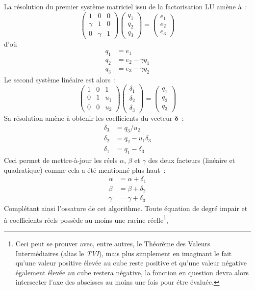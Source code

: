 \documentclass[11pt]{amsart}
\newcommand{\vb}[1]{\mathbf{#1}}
\begin{document}
La r\'esolution du premier syst\`eme matriciel issu de la factorisation LU am\`ene \`a~:
$$\begin{pmatrix} 1 & 0 & 0 \\ \gamma & 1 & 0  \\ 0 & \gamma & 1 \end{pmatrix}\begin{pmatrix} q_1 \\ q_2 \\ q_3 \end{pmatrix}=\begin{pmatrix} e_1 \\ e_2 \\ e_3 \end{pmatrix}$$
d'o\`u
\[
\begin{split}
	q_1 &= e_1 \\
	q_2 &= e_2 - \gamma{}q_1 \\
	q_3 &= e_3 - \gamma{}q_2
\end{split}
\]
Le second syst\`eme lin\'eaire est alors~:
$$\begin{pmatrix} 1 & 0 & 1 \\ 0 & 1 & u_1 \\ 0 & 0 & u_2 \end{pmatrix}\begin{pmatrix} \delta_1 \\ \delta_2 \\ \delta_3 \end{pmatrix}=\begin{pmatrix} q_1 \\ q_2 \\ q_3 \end{pmatrix}$$
Sa r\'esolution am\`ene \`a obtenir les coefficients du vecteur $\vb{\delta}$~:
\[
\begin{split}
\delta_3 &= q_3 / u_2 \\
\delta_2 &= q_2 - u_1\delta_3 \\
\delta_1 &= q_1 - \delta_3
\end{split}
\]
Ceci permet de mettre-\`a-jour les r\'eels $\alpha$, $\beta$ et $\gamma$ des deux facteurs (lin\'eaire et quadratique) comme cela a \'et\'e mentionn\'e plus haut~:
\[
\begin{split}
\alpha &= \alpha + \delta_1 \\
\beta &= \beta + \delta_2 \\
\gamma &= \gamma + \delta_3
\end{split}
\]
Compl\'etant ainsi l'ossature de cet algorithme. Toute \'equation de degr\'e impair et \`a coefficients r\'eels poss\`ede au moins une racine r\'eelle\footnote{Ceci peut se prouver avec, entre autres, le Th\'eor\`eme des Valeurs Interm\'ediaires (alias le \textit{TVI}),
mais plus simplement en imaginant le fait qu'une valeur positive \'elev\'ee au cube reste positive et qu'une valeur n\'egative \'egalement \'elev\'ee au cube restera n\'egative, la fonction en question devra alors intersecter l'axe des abscisses au moins une fois pour \'etre \'evalu\'ee.},
\end{document}
